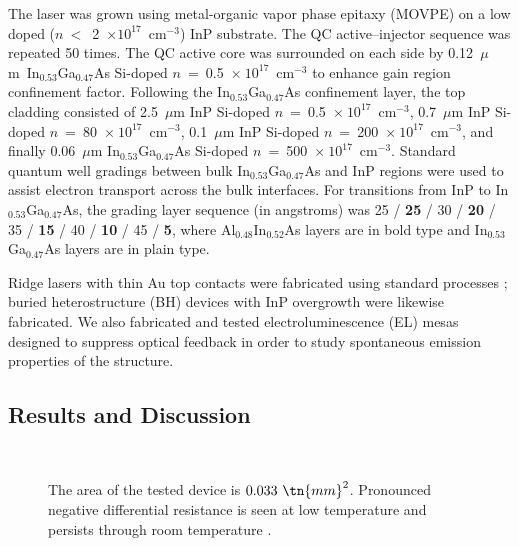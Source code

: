 The laser was grown using metal-organic vapor phase epitaxy (MOVPE) on a low doped ($n~<$~2~$\times 10^{17}$~cm$^{-3}$) InP substrate.  The QC active--injector sequence was repeated 50 times.  The QC active core was surrounded on each side by 0.12~$\mu$m~In$_{0.53}$Ga$_{0.47}$As Si-doped $n$~=~0.5~$\times~10^{17}$~cm$^{-3}$ to enhance gain region confinement factor.  Following the In$_{0.53}$Ga$_{0.47}$As confinement layer, the top cladding consisted of 2.5~$\mu$m InP Si-doped $n$~=~0.5~$\times~10^{17}$~cm$^{-3}$, 0.7~$\mu$m InP Si-doped $n$~=~80~$\times~10^{17}$~cm$^{-3}$, 0.1~$\mu$m InP Si-doped $n$~=~200~$\times~10^{17}$~cm$^{-3}$, and finally 0.06~$\mu$m In$_{0.53}$Ga$_{0.47}$As Si-doped $n$~=~500~$\times~10^{17}$~cm$^{-3}$.  Standard quantum well gradings between bulk In$_{0.53}$Ga$_{0.47}$As and InP regions were used to assist electron transport across the bulk interfaces.  For transitions from InP to In$_{0.53}$Ga$_{0.47}$As, the grading layer sequence (in angstroms) was 25 / \textbf{25} / 30 / \textbf{20} / 35 / \textbf{15} / 40 / \textbf{10} / 45 / \textbf{5}, where Al$_{0.48}$In$_{0.52}$As layers are in bold type and In$_{0.53}$Ga$_{0.47}$As layers are in plain type.

Ridge lasers with thin Au top contacts were fabricated using standard processes \cite{Franz:APL:2007}; buried heterostructure (BH) devices with InP overgrowth were likewise fabricated.  We also fabricated and tested electroluminescence (EL) mesas \cite{Franz:APL:2007} designed to suppress optical feedback in order to study spontaneous emission properties of the structure.

\subsection{Results and Discussion}

\begin{figure}[tp]%
\centering%
%
\\
%
\caption[Three injector well EL LIV data]{  The area of the tested device is $0.033~\tn{mm}^2$.  Pronounced negative differential resistance is seen at low temperature  and persists through room temperature .}
\label{3well:EL_LIV}
\end{figure}

